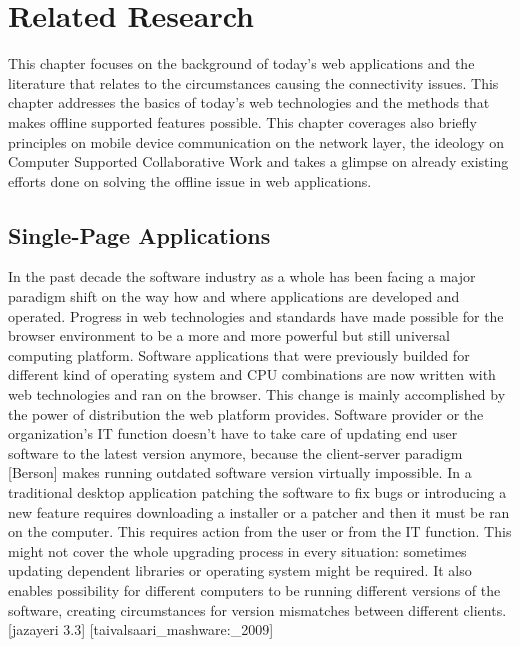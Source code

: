 
\chapter{Related Research}

This chapter focuses on the background of today's web applications and the literature that relates to the circumstances causing the connectivity issues. This chapter addresses the basics of today's web technologies and the methods that makes offline supported features possible. This chapter coverages also briefly principles on mobile device communication on the network layer, the ideology on Computer Supported Collaborative Work and takes a glimpse on already existing efforts done on solving the offline issue in web applications.



\section{Single-Page Applications}


In the past decade the software industry as a whole has been facing a major paradigm shift on the way how and where applications are developed and operated. Progress in web technologies and standards have made possible for the browser environment to be a more and more powerful but still universal computing platform. Software applications that were previously builded for different kind of operating system and CPU combinations are now written with web technologies and ran on the browser. This change is mainly accomplished by the power of distribution the web platform provides. Software provider or the organization's IT function doesn't have to take care of updating end user software to the latest version anymore, because the client-server paradigm [Berson] makes running outdated software version virtually impossible. In a traditional desktop application patching the software to fix bugs or introducing a new feature requires downloading a installer or a patcher and then it must be ran on the computer. This requires action from the user or from the IT function. This might not cover the whole upgrading process in every situation: sometimes updating dependent libraries or operating system might be required. It also enables possibility for different computers to be running different versions of the software, creating circumstances for version mismatches between different clients. [jazayeri 3.3] [taivalsaari_mashware:_2009]

